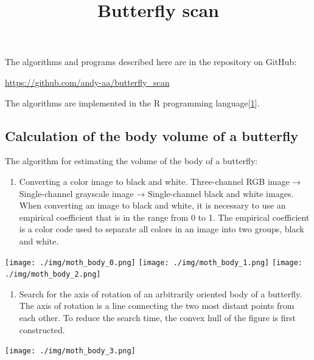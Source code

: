 \documentclass[
]{article}
\title{Butterfly scan}
\author{}
\date{\vspace{-2.5em}}
\providecommand{\tightlist}{%
  \setlength{\itemsep}{0pt}\setlength{\parskip}{0pt}}
\let\origfigure\figure
\let\endorigfigure\endfigure
\renewenvironment{figure}[1][2] {
    \expandafter\origfigure\expandafter[H]
} {
    \endorigfigure
}
\begin{document}
\maketitle

The algorithms and programs described here are in the repository on
GitHub:

\url{https://github.com/andy-aa/butterfly_scan}

The algorithms are implemented in the R programming
language{[}\protect\hyperlink{ref-R-base}{1}{]}.

\hypertarget{calculation-of-the-body-volume-of-a-butterfly}{%
\subsection{Calculation of the body volume of a
butterfly}\label{calculation-of-the-body-volume-of-a-butterfly}}

The algorithm for estimating the volume of the body of a butterfly:

\begin{enumerate}
\def\labelenumi{\arabic{enumi}.}
\tightlist
\item
  Converting a color image to black and white. Three-channel RGB image →
  Single-channel grayscale image → Single-channel black and white
  images. When converting an image to black and white, it is necessary
  to use an empirical coefficient that is in the range from 0 to 1. The
  empirical coefficient is a color code used to separate all colors in
  an image into two groups, black and white.
\end{enumerate}

\texttt{[image: ./img/moth\_body\_0.png]}
\texttt{[image: ./img/moth\_body\_1.png]}
\texttt{[image: ./img/moth\_body\_2.png]}

\begin{enumerate}
\def\labelenumi{\arabic{enumi}.}
\setcounter{enumi}{1}
\tightlist
\item
  Search for the axis of rotation of an arbitrarily oriented body of a
  butterfly. The axis of rotation is a line connecting the two most
  distant points from each other. To reduce the search time, the convex
  hull of the figure is first constructed.
\end{enumerate}

\begin{figure}
\centering
\texttt{[image: ./img/moth\_body\_3.png]}
\caption{Convex hull}
\end{figure}
\end{document}
